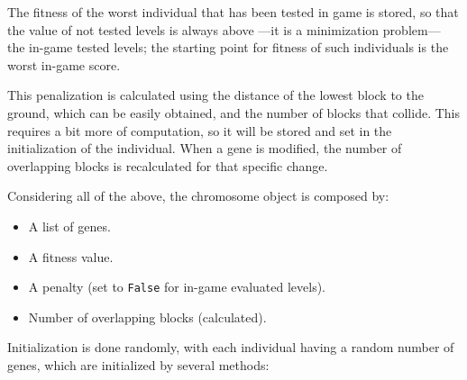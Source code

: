 \documentclass[sigconf]{acmart}
\begin{document}

The fitness of the worst individual that has been tested in game is
stored, so that the value of not tested levels is always above ---it is a minimization problem--- the in-game 
tested levels; the starting point for fitness of such individuals is the 
worst in-game score.

This penalization is calculated using the distance of the lowest block to the 
ground, which can be easily obtained, and the number of blocks that collide. 
This requires a bit more of computation, so it will be stored and set in the 
initialization of the individual. When a gene is modified, the number of 
overlapping blocks is recalculated for that specific change.

Considering all of the above, the chromosome object is composed by:
\begin{itemize}
	\item A list of genes.
	\item A fitness value.
	\item A penalty (set to {\tt False} for in-game evaluated levels).
	\item Number of overlapping blocks (calculated).
\end{itemize} %


Initialization is done randomly, with each individual having a random number of 
genes, which are initialized by several methods: 
\end{document}
